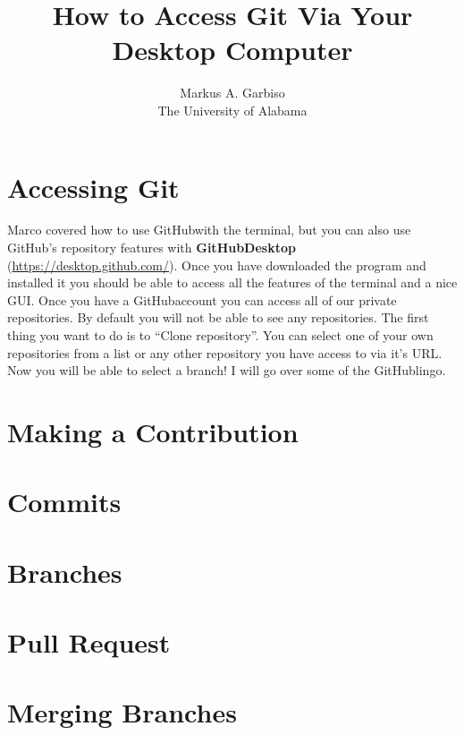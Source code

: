 \documentclass{article}
\title{How to Access Git Via Your Desktop Computer} %
\author{Markus A. Garbiso \\ The University of Alabama} %
\newcommand{\gh}{GitHub}
\begin{document}
\maketitle

\section{Accessing Git}

Marco covered how to use \gh with the terminal, but you can also use \gh's repository features with \textbf{\gh Desktop} (\href{https://desktop.github.com/}{https://desktop.github.com/}). Once you have downloaded the program and installed it you should be able to access all the features of the terminal and a nice GUI. Once you have a \gh account you can access all of our private repositories. By default you will not be able to see any repositories. The first thing you want to do is to ``Clone repository''.  You can select one of your own repositories from a list or any other repository you have access to via it's URL. Now you will be able to select a branch! I will go over some of the \gh lingo.

\section{Making a Contribution}

\section{Commits}

\section{Branches}

\section{Pull Request}

\section{Merging Branches}
\end{document}

